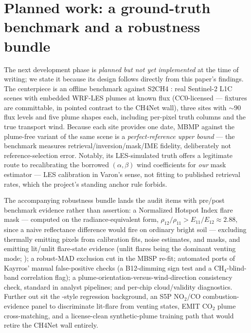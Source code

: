 \documentclass[11pt]{article}
\begin{document}
\section{Planned work: a ground-truth benchmark and a robustness
bundle}\label{sec:future}

The next development phase is \emph{planned but not yet implemented} at
the time of writing; we state it because its design follows directly from
this paper's findings. The centerpiece is an offline benchmark against
S2CH4 \citep{gorrono2023,s2ch4_dataset}: real Sentinel-2 L1C scenes with
embedded WRF-LES plumes at known flux (CC0-licensed --- fixtures are
committable, in pointed contrast to the CH4Net wall), three sites with
${\sim}90$ flux levels and five plume shapes each, including per-pixel
truth columns and the true transport wind. Because each site provides one
date, MBMP against the plume-free variant of the same scene is a
\emph{perfect-reference upper bound} --- the benchmark measures
retrieval/inversion/mask/IME fidelity, deliberately not
reference-selection error. Notably, its LES-simulated truth offers a
legitimate route to recalibrating the borrowed $(\alpha, \beta)$ wind
coefficients for \emph{our} mask estimator --- LES calibration in
Varon's sense, not fitting to published retrieval rates, which the
project's standing anchor rule forbids.

The accompanying robustness bundle lands the audit items with pre/post
benchmark evidence rather than assertion: a Normalized Hotspot Index flare
mask \citep{marchese2019} --- computed on the radiance-equivalent form,
$\rho_{12}/\rho_{11} > E_{11}/E_{12} \approx 2.88$, since a naive
reflectance difference would fire on ordinary bright soil --- excluding
thermally emitting pixels from calibration fits, noise estimates, and
masks, and emitting lit/unlit flare-state evidence (unlit flares being the
dominant venting mode; \citealp{plant2022,irakulis2022}); a robust-MAD
exclusion cut in the MBSP re-fit; automated ports of Kayrros' manual
false-positive checks (a B12-dimming sign test and a
CH$_4$-blind-band correlation flag); a plume-orientation-versus-wind-direction
consistency check, standard in analyst pipelines; and per-chip
cloud/validity diagnostics. Further out sit the \citet{ehret2022}-style regression
background, an S5P NO$_2$/CO combustion-evidence panel to discriminate
lit-flare from venting states, EMIT CO$_2$ plume cross-matching, and a
license-clean synthetic-plume training path that would retire the CH4Net
wall entirely.
\end{document}

